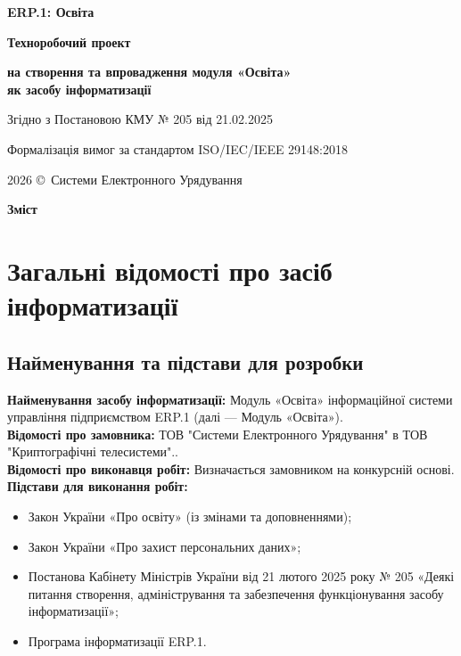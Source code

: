 \documentclass{article}
\newcommand\HUGE[1]{\fontsize{40}{40}\selectfont #1}
\begin{document}
\pagestyle{fancy}

\begin{titlepage}
  \AddToShipoutPictureBG*{\AtPageLowerLeft{\color{nato}\rule{\paperwidth}{\paperheight}}}
  \color{white}\thispagestyle{empty}\vspace*{3cm}\centering
  {\Huge  \textbf{ERP.1: Освіта} \par} \vspace{1.5cm}
  {\HUGE  \textbf{Техноробочий проект} \par} \vspace{1.5cm}
  {\LARGE \textbf{на створення та впровадження модуля «Освіта» \\ як засобу інформатизації} \par} \vspace{1.5cm}
  {\large Згідно з Постановою КМУ № 205 від 21.02.2025 \par}
  {\large Формалізація вимог за стандартом ISO/IEC/IEEE 29148:2018 \par}
  \vfill
  {\large 2026 \copyright\ Системи Електронного Урядування \par}
\end{titlepage}

\newpage

\begin{center}
  {\Huge\color{nato}\bfseries Зміст\par}
\end{center}
\vspace{40pt}
\tableofcontents

\newpage

\section{Загальні відомості про засіб інформатизації}

\subsection{Найменування та підстави для розробки}
\textbf{Найменування засобу інформатизації:} Модуль «Освіта» інформаційної системи управління підприємством ERP.1 (далі --- Модуль «Освіта»).
\\
\textbf{Відомості про замовника:} ТОВ "Системи Електронного Урядування" в ТОВ "Криптографічні телесистеми"..
\\
\textbf{Відомості про виконавця робіт:} Визначається замовником на конкурсній основі.
\\
\textbf{Підстави для виконання робіт:}
\begin{itemize}
    \item Закон України «Про освіту» (із змінами та доповненнями);
    \item Закон України «Про захист персональних даних»;
    \item Постанова Кабінету Міністрів України від 21 лютого 2025 року № 205 «Деякі питання створення, адміністрування та забезпечення функціонування засобу інформатизації»;
    \item Програма інформатизації ERP.1.
\end{itemize}
\end{document}
